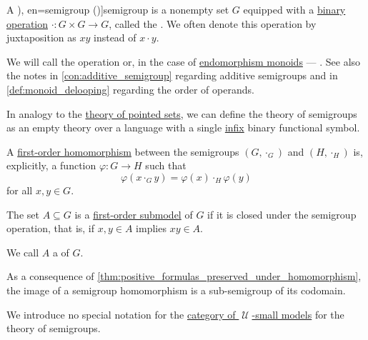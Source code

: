 \begin{definition}\label{def:semigroup}
  A \term[ru=полугруппа (\cite[28]{Ляпин1960Полугруппы}), en=semigroup (\cite[144]{MacLane1998CategoryTheory})]{semigroup} is a nonempty set \( G \) equipped with a \hyperref[def:operation_arity_terminology]{binary} \hyperref[def:operation_on_set]{operation} \( \cdot: G \times G \to G \), called the . We often denote this operation by juxtaposition as \( xy \) instead of \( x \cdot y \).

  We will call the operation  or, in the case of \hyperref[def:endomorphism_monoid]{endomorphism monoids} --- . See also the notes in \cref{con:additive_semigroup} regarding additive semigroups and in \cref{def:monoid_delooping} regarding the order of operands.

  \begin{thmenum}[series=def:semigroup]
    \mimprovised In analogy to the \hyperref[def:pointed_set/theory]{theory of pointed sets}, we can define the theory of semigroups as an empty theory over a language with a single \hyperref[def:function_application_syntax]{infix} binary functional symbol.

     A \hyperref[def:first_order_homomorphism]{first-order homomorphism} between the semigroups \( (G, \cdot_{G}) \) and \( (H, \cdot_{H}) \) is, explicitly, a function \( \varphi: G \to H \) such that
    \begin{equation}\label{eq:def:semigroup/homomorphism}
      \varphi(x \cdot_{G} y) = \varphi(x) \cdot_{H} \varphi(y)
    \end{equation}
    for all \( x, y \in G \).

     The set \( A \subseteq G \) is a \hyperref[def:first_order_substructure]{first-order submodel} of \( G \) if it is closed under the semigroup operation, that is, if \( x, y \in A \) implies \( xy \in A \).

    We call \( A \) a  of \( G \).

    As a consequence of \cref{thm:positive_formulas_preserved_under_homomorphism}, the image of a semigroup homomorphism is a sub-semigroup of its codomain.

    \mimprovised We introduce no special notation for the \hyperref[def:category_of_small_first_order_models]{category of \( \mscrU \)-small models} for the theory of semigroups.


\end{thmenum}
\end{definition}
